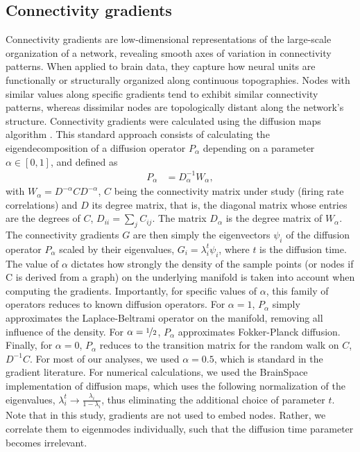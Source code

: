 \documentclass{article}
\begin{document}
\subsection*{Connectivity gradients}

Connectivity gradients are low-dimensional representations of the large-scale organization of a network, revealing smooth axes of variation in connectivity patterns. When applied to brain data, they capture how neural units are functionally or structurally organized along continuous topographies. Nodes with similar values along specific gradients tend to exhibit similar connectivity patterns, whereas dissimilar nodes are topologically distant along the network's structure. Connectivity gradients were calculated using the diffusion maps algorithm \cite{Coifman2006}. This standard approach consists of calculating the eigendecomposition of a diffusion operator $P_\alpha$ depending on a parameter $\alpha \in [0, 1]$, and defined as 
\begin{align*}
    P_\alpha &= D_\alpha^{-1}W_{\alpha},
\end{align*}
with $W_{\alpha} = D^{-\alpha} C D^{-\alpha}$, $C$ being the connectivity matrix under study (firing rate correlations) and $D$ its degree matrix, that is, the diagonal matrix whose entries are the degrees of $C$, $D_{i i} = \sum_{j}C_{ij}$. The matrix $D_\alpha$ is the degree matrix of $W_\alpha$. The connectivity gradients $G$ are then simply the eigenvectors $\psi_i$ of the diffusion operator $P_\alpha$ scaled by their eigenvalues, $G_i=\lambda_i^t\psi_i$, where $t$ is the diffusion time. The value of $\alpha$ dictates how strongly the density of the sample points (or nodes if C is derived from a graph) on the underlying manifold is taken into account when computing the gradients. Importantly, for specific values of $\alpha$, this family of operators reduces to known diffusion operators. For $\alpha = 1$, $P_\alpha$ simply approximates the Laplace-Beltrami operator on the manifold, removing all influence of the density. For $\alpha = \nicefrac{1}{2}$, $P_\alpha$ approximates Fokker-Planck diffusion. Finally, for $\alpha = 0$, $P_\alpha$ reduces to the transition matrix for the random walk on $C$, $D^{-1}C$. For most of our analyses, we used $\alpha=0.5$, which is standard in the gradient literature. For numerical calculations, we used the BrainSpace implementation of diffusion maps\cite{vos2020brainspace}, which uses the following normalization of the eigenvalues, $\lambda_i^t\to \frac{\lambda_i}{1 - \lambda_i}$, thus eliminating the additional choice of parameter $t$. Note that in this study, gradients are not used to embed nodes. Rather, we correlate them to eigenmodes individually, such that the diffusion time parameter becomes irrelevant.
\end{document}
